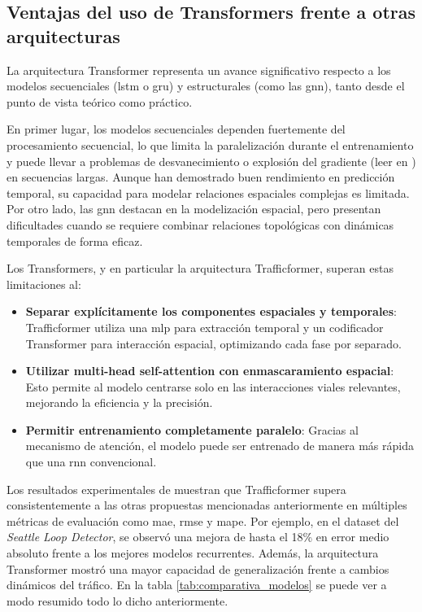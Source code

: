 \subsection{Ventajas del uso de Transformers frente a otras arquitecturas}

La arquitectura Transformer representa un avance significativo respecto a los modelos secuenciales (\acrshort{lstm} o \acrshort{gru}) y estructurales (como las \acrshort{gnn}), tanto desde el punto de vista teórico como práctico.

En primer lugar, los modelos secuenciales dependen fuertemente del procesamiento secuencial, lo que limita la paralelización durante el entrenamiento y puede llevar a problemas de desvanecimiento o explosión del gradiente (leer en \cite{desvGradiente}) en secuencias largas. Aunque han demostrado buen rendimiento en predicción temporal, su capacidad para modelar relaciones espaciales complejas es limitada. Por otro lado, las \acrshort{gnn} destacan en la modelización espacial, pero presentan dificultades cuando se requiere combinar relaciones topológicas con dinámicas temporales de forma eficaz.

Los Transformers, y en particular la arquitectura Trafficformer, superan estas limitaciones al:

\begin{itemize}
	\item \textbf{Separar explícitamente los componentes espaciales y temporales}: Trafficformer utiliza una \acrshort{mlp} para extracción temporal y un codificador Transformer para interacción espacial, optimizando cada fase por separado.
	\item \textbf{Utilizar multi-head self-attention con enmascaramiento espacial}: Esto permite al modelo centrarse solo en las interacciones viales relevantes, mejorando la eficiencia y la precisión.
	\item \textbf{Permitir entrenamiento completamente paralelo}: Gracias al mecanismo de atención, el modelo puede ser entrenado de manera más rápida que una \acrshort{rnn} convencional.
\end{itemize}

Los resultados experimentales de \cite{trafficformer} muestran que Trafficformer supera consistentemente a las otras propuestas mencionadas anteriormente en múltiples métricas de evaluación como \acrshort{mae}, \acrshort{rmse} y \acrshort{mape}. Por ejemplo, en el dataset del \textit{Seattle Loop Detector}, se observó una mejora de hasta el 18\% en error medio absoluto frente a los mejores modelos recurrentes. Además, la arquitectura Transformer mostró una mayor capacidad de generalización frente a cambios dinámicos del tráfico. En la tabla \ref{tab:comparativa_modelos} se puede ver a modo resumido todo lo dicho anteriormente.

